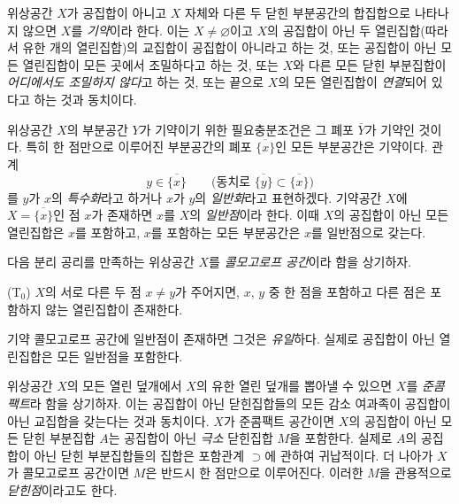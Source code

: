 \begin{env}[2.1.1]
\label{0.2.1.1-ko}
위상공간 $X$가 공집합이 아니고 $X$ 자체와 다른 두 닫힌 부분공간의 합집합으로 나타나지 않으면 $X$를 \emph{기약}이라 한다. 이는 $X\neq\varnothing$이고 $X$의 공집합이 아닌 두 열린집합(따라서 유한 개의 열린집합)의 교집합이 공집합이 아니라고 하는 것, 또는 공집합이 아닌 모든 열린집합이 모든 곳에서 조밀하다고 하는 것, 또는 $X$와 다른 모든 닫힌 부분집합이 \emph{어디에서도 조밀하지 않다}고 하는 것, 또는 끝으로 $X$의 모든 열린집합이 \emph{연결}되어 있다고 하는 것과 동치이다.
\end{env}

\begin{env}[2.1.2]
\label{0.2.1.2-ko}
위상공간 $X$의 부분공간 $Y$가 기약이기 위한 필요충분조건은 그 폐포 $\overline Y$가 기약인 것이다. 특히 한 점만으로 이루어진 부분공간의 폐포 $\overline{\{x\}}$인 모든 부분공간은 기약이다. 관계
\[
  y\in\overline{\{x\}}
  \qquad\bigl(\text{동치로 }\overline{\{y\}}\subset\overline{\{x\}}\bigr)
\]
를 $y$가 $x$의 \emph{특수화}라고 하거나 $x$가 $y$의 \emph{일반화}라고 표현하겠다. 기약공간 $X$에 $X=\overline{\{x\}}$인 점 $x$가 존재하면 $x$를 $X$의 \emph{일반점}이라 한다. 이때 $X$의 공집합이 아닌 모든 열린집합은 $x$를 포함하고, $x$를 포함하는 모든 부분공간은 $x$를 일반점으로 갖는다.
\end{env}

\begin{env}[2.1.3]
\label{0.2.1.3-ko}
다음 분리 공리를 만족하는 위상공간 $X$를 \emph{콜모고로프 공간}이라 함을 상기하자.

\smallskip
\noindent
\textup{(T$_0$)} $X$의 서로 다른 두 점 $x\neq y$가 주어지면, $x$, $y$ 중 한 점을 포함하고 다른 점은 포함하지 않는 열린집합이 존재한다.

기약 콜모고로프 공간에 일반점이 존재하면 그것은 \emph{유일}하다. 실제로 공집합이 아닌 열린집합은 모든 일반점을 포함한다.

위상공간 $X$의 모든 열린 덮개에서 $X$의 유한 열린 덮개를 뽑아낼 수 있으면 $X$를 \emph{준콤팩트}라 함을 상기하자. 이는 공집합이 아닌 닫힌집합들의 모든 감소 여과족이 공집합이 아닌 교집합을 갖는다는 것과 동치이다. $X$가 준콤팩트 공간이면 $X$의 공집합이 아닌 모든 닫힌 부분집합 $A$는 공집합이 아닌 \emph{극소} 닫힌집합 $M$을 포함한다. 실제로 $A$의 공집합이 아닌 닫힌 부분집합들의 집합은 포함관계 $\supset$에 관하여 귀납적이다. 더 나아가 $X$가 콜모고로프 공간이면 $M$은 반드시 한 점만으로 이루어진다. 이러한 $M$을 관용적으로 \emph{닫힌점}이라고도 한다.
\end{env}

